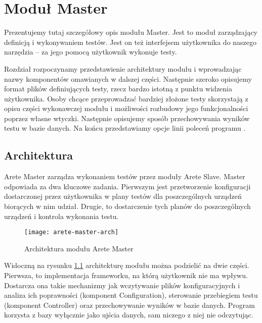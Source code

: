 \documentclass[00-praca-magisterska.tex]{subfiles}
\begin{document}
\label{arete-master}
\chapter{Moduł Master}

Prezentujemy tutaj szczegółowy opis modułu Master. Jest to moduł zarządzający
definicją i wykonywaniem testów. Jest on też interfejsem użytkownika do naszego
narzędzia -- za jego pomocą użytkownik wykonuje testy.

Rozdział rozpoczynamy przedstawienie architektury modułu i wprowadzając nazwy
komponentów omawianych w dalszej części. Następnie szeroko opisujemy format
plików definiujących testy, rzecz bardzo istotną z punktu widzenia użytkownika.
Osoby chcące przeprowadzać bardziej złożone testy skorzystają z opisu części
wykonawczej modułu i możliwości rozbudowy jego funkcjonalności poprzez własne
wtyczki. Następnie opisujemy sposób przechowywania wyników testu w bazie
danych. Na końcu przedstawiamy opcje linii poleceń programu .

\label{arete-master-arch}
\section{Architektura}

Arete Master zarządza wykonaniem testów przez moduły Arete Slave. Master
odpowiada za dwa kluczowe zadania. Pierwszym jest przetworzenie konfiguracji
dostarczonej przez użytkownika w plany testów dla poszczególnych urządzeń
biorących w nim udział. Drugie, to dostarczenie tych planów do poszczególnych
urządzeń i kontrola wykonania testu.

\begin{figure}[htb]
\begin{center}
\leavevmode
\texttt{[image: arete-master-arch]}
\end{center}
\caption{Architektura modułu Arete Master}
\label{fig:arete-master-arch}
\end{figure}

Widoczną na rysunku \ref{fig:arete-master-arch} architekturę modułu można
podzielić na dwie części. Pierwsza, to implementacja frameworku, na którą
użytkownik nie ma wpływu. Dostarcza ona takie mechanizmy jak wczytywanie plików
konfiguracyjnych i analiza ich poprawności (komponent Configuration),
sterowanie przebiegiem testu (komponent Controller) oraz przechowywanie wyników
w bazie danych. Program korzysta z bazy wyłącznie jako ujścia danych, sam
niczego z niej nie odczytując.
\end{document}

